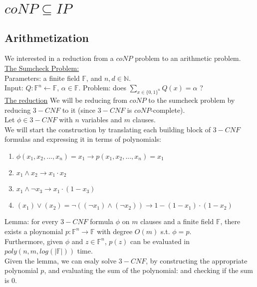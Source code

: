 \section*{$coNP\subseteq IP$}
\subsection*{Arithmetization}
We interested in a reduction from a $coNP$ problem to an arithmetic
problem.\\

\underline{The Sumcheck Problem:}\\
Parameters: a finite field $\mathbb{F}$, and $n,d\in\mathbb{N}$.\\
Input: $Q:\mathbb{F}^n\leftarrow\mathbb{F}$, $\alpha\in\mathbb{F}$.
Problem: does $\sum_{x\in\{0,1\}^n}Q(x)=\alpha$ ?\\

\underline{The reduction}
We will be reducing from $coNP$ to the sumcheck problem
by reducing $3-CNF$ to it (since $3-CNF$ is $coNP$-complete).\\
Let $\phi\in 3-CNF$ with $n$ variables and $m$ clauses.\\
We will start the construction by translating each building block
of $3-CNF$ formulas and expressing it in terms of polynomials:
\begin{enumerate}
	\item $\phi(x_1,x_2,...,x_n)=x_1\longrightarrow p(x_1,x_2,...,x_n)=x_1$
	\item $x_1\wedge x_2 \longrightarrow x_1\cdot x_2$
	\item $x_1\wedge \neg x_3\longrightarrow x_1\cdot(1-x_3)$
	\item $(x_1)\vee (x_2)=\neg((\neg x_1)\wedge(\neg x_2))\longrightarrow 1-(1-x_1)\cdot(1-x_2)$
\end{enumerate}
Lemma: for every $3-CNF$ formula $\phi$ on $m$ clauses and a finite field $\mathbb{F}$,
there exists a ploynomial $p:\mathbb{F}^n\rightarrow\mathbb{F}$ with degree $O(m)$ s.t.
$\phi=p$.\\
Furthermore, given $\phi$ and $z\in\mathbb{F}^n$, $p(z)$ can be
evaluated in $poly(n,m,log(|\mathbb{F}|))$ time.\\

Given the lemma, we can esaly solve $3-CNF$, by constructing the
appropriate polynomial $p$, and evaluating the sum of the polynomial:
and checking if the sum is $0$.

